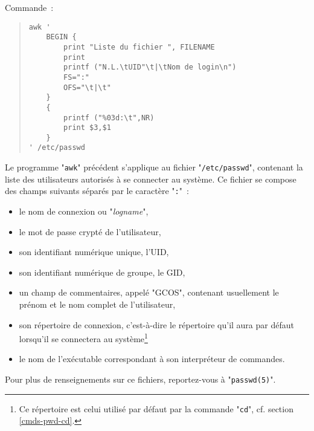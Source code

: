 \begin{example}
Commande~:
\begin{quote}
\begin{verbatim}
awk '
    BEGIN {
        print "Liste du fichier ", FILENAME
        print
        printf ("N.L.\tUID"\t|\tNom de login\n")
        FS=":"
        OFS="\t|\t"
    }
    {
        printf ("%03d:\t",NR)
        print $3,$1
    }
' /etc/passwd
\end{verbatim}
\end{quote}

Le programme "\texttt{awk}" pr{\'e}c{\'e}dent s'applique au fichier "\texttt{/etc/passwd}",
contenant la liste des utilisateurs autoris{\'e}s {\`a} se connecter au syst{\`e}me. Ce fichier
se compose des champs suivants s{\'e}par{\'e}s par le caract{\`e}re "\texttt{:}"~:
\begin{itemize}
	\item	le nom de connexion ou "\textsl{logname}",
	\item	le mot de passe crypt{\'e} de l'utilisateur,
	\item	son identifiant num{\'e}rique unique, l'UID,
	\item	son identifiant num{\'e}rique de groupe, le GID,
	\item	un champ de commentaires, appel{\'e} "GCOS", contenant usuellement
			le pr{\'e}nom et le nom complet de l'utilisateur,
	\item	son r{\'e}pertoire de connexion, c'est-{\`a}-dire le r{\'e}pertoire qu'il aura
			par d{\'e}faut lorsqu'il se connectera au syst{\`e}me\footnote{Ce r{\'e}pertoire
			est celui utilis{\'e} par d{\'e}faut par la commande "\texttt{cd}", cf.
			section \ref{cmds-pwd-cd}.}
	\item	le nom de l'ex{\'e}cutable correspondant {\`a} son interpr{\'e}teur de commandes.
\end{itemize}
Pour plus de renseignements sur ce fichiers, reportez-vous {\`a} "\texttt{passwd(5)}". 


\end{example}
